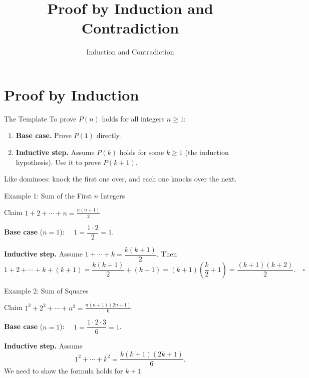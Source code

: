 \documentclass[10pt,aspectratio=169]{beamer}
\title{Proof by Induction and Contradiction}
\subtitle{Induction and Contradiction}
\date{}
\author{}
\begin{document}
\maketitle

\section{Proof by Induction}

\begin{frame}{The Template}
  To prove $P(n)$ holds for all integers $n \ge 1$:

  \bigskip
  \begin{enumerate}
    \item \textbf{Base case.} Prove $P(1)$ directly.
    \bigskip
    \item \textbf{Inductive step.} Assume $P(k)$ holds for some $k \ge 1$
          (the \alert{induction hypothesis}). Use it to prove $P(k+1)$.
  \end{enumerate}

  \bigskip
  \begin{center}
    Like dominoes: knock the first one over, and each one knocks over the next.
  \end{center}
\end{frame}

\begin{frame}{Example 1: Sum of the First $n$ Integers}
  \begin{block}{Claim}
    $\displaystyle 1 + 2 + \cdots + n = \frac{n(n+1)}{2}$
  \end{block}

  \pause
  \bigskip
  \textbf{Base case} ($n = 1$): $\quad 1 = \dfrac{1 \cdot 2}{2} = 1$.

  \pause
  \bigskip
  \textbf{Inductive step.} Assume $1 + \cdots + k = \dfrac{k(k+1)}{2}$.  Then
  \[
    1 + 2 + \cdots + k + (k+1)
    = \frac{k(k+1)}{2} + (k+1)
    = (k+1)\!\left(\frac{k}{2} + 1\right)
    = \frac{(k+1)(k+2)}{2}. \quad \square
  \]
\end{frame}

\begin{frame}{Example 2: Sum of Squares}
  \begin{block}{Claim}
    $\displaystyle 1^2 + 2^2 + \cdots + n^2 = \frac{n(n+1)(2n+1)}{6}$
  \end{block}

  \bigskip
  \textbf{Base case} ($n = 1$): $\quad 1 = \dfrac{1 \cdot 2 \cdot 3}{6} = 1$.

  \bigskip
  \textbf{Inductive step.} Assume
  \[
    1^2 + \cdots + k^2 = \frac{k(k+1)(2k+1)}{6}.
  \]
  We need to show the formula holds for $k+1$.
\end{frame}
\end{document}
